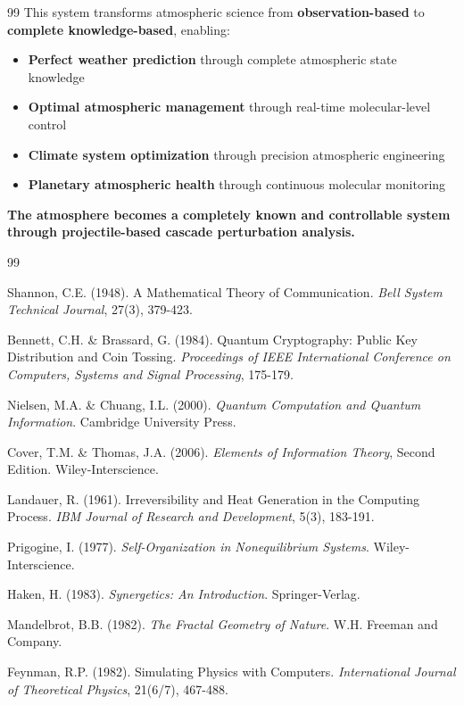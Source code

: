 \documentclass[12pt,a4paper]{article}
\begin{document}
\begin{thebibliography}{99}
This system transforms atmospheric science from \textbf{observation-based} to \textbf{complete knowledge-based}, enabling:
\begin{itemize}
\item \textbf{Perfect weather prediction} through complete atmospheric state knowledge
\item \textbf{Optimal atmospheric management} through real-time molecular-level control
\item \textbf{Climate system optimization} through precision atmospheric engineering
\item \textbf{Planetary atmospheric health} through continuous molecular monitoring
\end{itemize}

\textbf{The atmosphere becomes a completely known and controllable system through projectile-based cascade perturbation analysis.}

\begin{thebibliography}{99}

Shannon, C.E. (1948). A Mathematical Theory of Communication. \textit{Bell System Technical Journal}, 27(3), 379-423.

Bennett, C.H. \& Brassard, G. (1984). Quantum Cryptography: Public Key Distribution and Coin Tossing. \textit{Proceedings of IEEE International Conference on Computers, Systems and Signal Processing}, 175-179.

Nielsen, M.A. \& Chuang, I.L. (2000). \textit{Quantum Computation and Quantum Information}. Cambridge University Press.

Cover, T.M. \& Thomas, J.A. (2006). \textit{Elements of Information Theory}, Second Edition. Wiley-Interscience.

Landauer, R. (1961). Irreversibility and Heat Generation in the Computing Process. \textit{IBM Journal of Research and Development}, 5(3), 183-191.

Prigogine, I. (1977). \textit{Self-Organization in Nonequilibrium Systems}. Wiley-Interscience.

Haken, H. (1983). \textit{Synergetics: An Introduction}. Springer-Verlag.

Mandelbrot, B.B. (1982). \textit{The Fractal Geometry of Nature}. W.H. Freeman and Company.

Feynman, R.P. (1982). Simulating Physics with Computers. \textit{International Journal of Theoretical Physics}, 21(6/7), 467-488.


\end{thebibliography}
\end{thebibliography}
\end{document}
